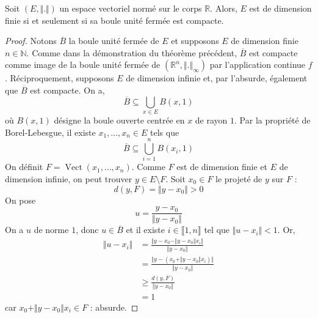  \begin{theorem}
    Soit $(E, \Vert . \Vert)$ un espace vectoriel normé sur le corps $\mathbb{R}$. Alors, $E$ est de dimension finie si et seulement si sa boule unité fermée est compacte.
  \end{theorem}

  \begin{proof}
    Notons $\overline{B}$ la boule unité fermée de $E$ et supposons $E$ de dimension finie $n \in \mathbb{N}$. Comme dans la démonstration du théorème précédent, $\overline{B}$ est compacte comme image de la boule unité fermée de $(\mathbb{R}^n, \Vert . \Vert_\infty)$ par l'application continue $f$. Réciproquement, supposons $E$ de dimension infinie et, par l'absurde, également que $\overline{B}$ est compacte. On a,
    \[ \overline{B} \subseteq \bigcup_{x \in E} B(x,1) \]
    où $B(x,1)$ désigne la boule ouverte centrée en $x$ de rayon $1$. Par la propriété de Borel-Lebesgue, il existe $x_1, \dots, x_n \in E$ tels que
    \[ \overline{B} \subseteq \bigcup_{i=1}^n B(x_i,1) \]
    On définit $F = \operatorname{Vect}(x_1, \dots, x_n)$. Comme $F$ est de dimension finie et $E$ de dimension infinie, on peut trouver $y \in E \setminus F$. Soit $x_0 \in F$ le projeté de $y$ sur $F$ :
    \[ d(y, F) = \Vert y - x_0 \Vert > 0 \]
    On pose
    \[ u = \frac{y - x_0}{\Vert y - x_0 \Vert} \]
    On a $u$ de norme $1$, donc $u \in \overline{B}$ et il existe $i \in \llbracket 1, n \rrbracket$ tel que $\Vert u - x_i \Vert < 1$. Or,
    \begin{align*}
      \Vert u - x_i \Vert &= \frac{\Vert y - x_0 - \Vert y - x_0 \Vert x_i \Vert}{\Vert y - x_0 \Vert} \\
      &= \frac{\Vert y - (x_0 + \Vert y - x_0 \Vert x_i) \Vert}{\Vert y - x_0 \Vert} \\
      &\geq \frac{d(y, F)}{\Vert y - x_0 \Vert} \\
      &= 1
    \end{align*}
    car $x_0 + \Vert y - x_0 \Vert x_i \in F$ : absurde.
  \end{proof}

